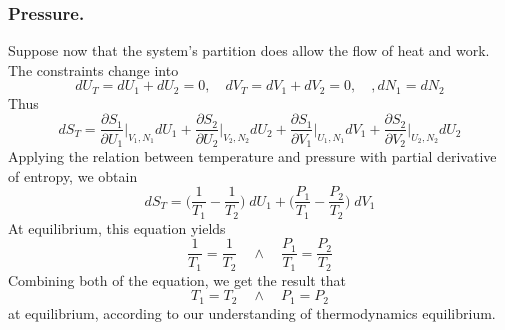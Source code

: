 \documentclass[../../../Main.tex]{subfiles}
\begin{document}
\subsubsection{Pressure.} Suppose now that the system's partition does allow the flow of heat and work. The constraints change into
\begin{equation*}
    dU_T=dU_1+dU_2=0, \quad dV_T=dV_1 +dV_2=0, \quad, dN_1=dN_2
\end{equation*}
Thus
\begin{equation*}
    dS_T=\frac{\partial S_1}{\partial U_1}\bigg|_{V_1,N_1} dU_1 + \frac{\partial S_2}{\partial U_2}\bigg|_{V_2,N_2} dU_2  +\frac{\partial S_1}{\partial V_1}\bigg|_{U_1,N_1} dV_1 + \frac{\partial S_2}{\partial V_2}\bigg|_{U_2,N_2} dU_2
\end{equation*}
Applying the relation between temperature and pressure with partial derivative of entropy, we obtain 
\begin{equation*}
    dS_T=\biggl(\frac{1}{T_1}-\frac{1}{T_2}\biggr)\;dU_1+\biggl(\frac{P_1}{T_1}-\frac{P_2}{T_2}\biggr)\;dV_1
\end{equation*}
At equilibrium, this equation yields
\begin{equation*}
    \frac{1}{T_1}=\frac{1 }{T_2}
    \quad\land\quad
    \frac{P_1}{T_1}=\frac{P_2}{T_2}
\end{equation*}
Combining both of the equation, we get the result that
\begin{equation*}
    T_1=T_2
    \quad\land\quad
    P_1=P_2
\end{equation*}
at equilibrium, according to our understanding of thermodynamics equilibrium.
\end{document}
